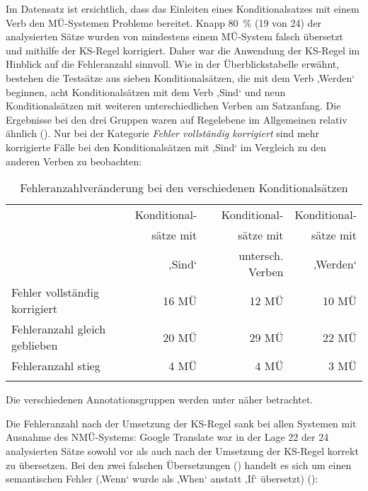 Im Datensatz ist ersichtlich, dass das Einleiten eines Konditionalsatzes mit einem Verb den MÜ-Systemen Probleme bereitet. Knapp 80~\% (19 von 24) der analysierten Sätze wurden von mindestens einem MÜ-System falsch übersetzt und mithilfe der KS-Regel korrigiert. Daher war die Anwendung der KS-Regel im Hinblick auf die Fehleranzahl sinnvoll. Wie in der Überblickstabelle erwähnt, bestehen die Testsätze aus sieben Konditionalsätzen, die mit dem Verb ‚Werden‘ beginnen, acht Konditionalsätzen mit dem Verb ‚Sind‘ und neun Konditionalsätzen mit weiteren unterschiedlichen Verben am Satzanfang. Die Ergebnisse bei den drei Gruppen waren auf Regelebene im Allgemeinen relativ ähnlich (). Nur bei der Kategorie \textit{Fehler vollständig korrigiert} sind mehr korrigierte Fälle bei den Konditionalsätzen mit ‚Sind‘ im Vergleich zu den anderen Verben zu beobachten:


\begin{table}
\begin{tabularx}{\textwidth}{Xrrr}

\lsptoprule
\multirow[t]{3}{=}{Veränderung in der Fehleranzahl nach Anwendung der Regel} & Konditional-  & Konditional-  & Konditional- \\
& sätze mit & sätze mit & sätze mit \\
& ‚Sind‘ & untersch. Verben & ‚Werden‘\\
\midrule
\rowcolor{lsLightGray}
Fehler vollständig korrigiert & 16 MÜ & 12 MÜ & 10 MÜ\\
Fehleranzahl gleich geblieben & 20 MÜ & 29 MÜ & 22 MÜ\\
Fehleranzahl stieg & 4 MÜ & 4 MÜ & 3 MÜ\\
\lspbottomrule
\end{tabularx}
\caption{\label{tab:05:40}Fehleranzahlveränderung bei den verschiedenen Konditionalsätzen   }
\end{table}
 Die verschiedenen Annotationsgruppen werden unter  näher betrachtet.



Die Fehleranzahl nach der Umsetzung der KS-Regel sank bei allen Systemen mit Ausnahme des\textbf{ }NMÜ-Systems: Google Translate war in der Lage 22 der 24 analysierten Sätze sowohl vor als auch nach der Umsetzung der KS-Regel korrekt zu übersetzen. Bei den zwei falschen Übersetzungen () handelt es sich um einen semantischen Fehler (‚Wenn‘ wurde als ‚When‘ anstatt ‚If‘ übersetzt) ():


